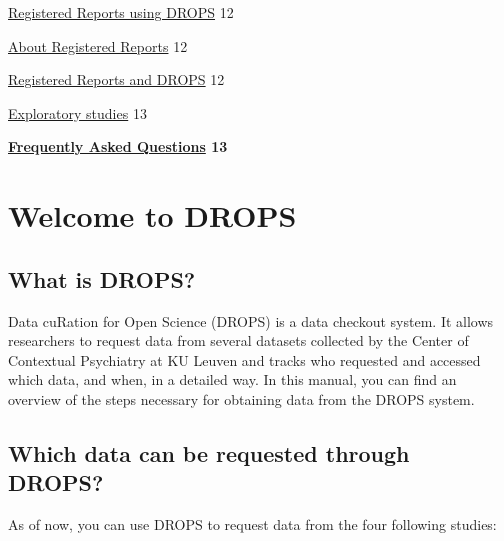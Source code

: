\documentclass[
]{article}
\begin{document}
\protect\hyperlink{_ffqkpx648yj2}{Registered Reports using DROPS} 12

\protect\hyperlink{_frgb5bv2wcbm}{About Registered Reports} 12

\protect\hyperlink{_6or3tby42f75}{Registered Reports and DROPS} 12

\protect\hyperlink{_q6nxcc4a4n2f}{Exploratory studies} 13

\textbf{\protect\hyperlink{_zc50z372ij74}{Frequently Asked Questions}
13}

\hypertarget{welcome-to-drops}{%
\section{Welcome to DROPS}\label{welcome-to-drops}}

\hypertarget{what-is-drops}{%
\subsection{What is DROPS?}\label{what-is-drops}}

Data cuRation for Open Science (DROPS) is a data checkout system. It
allows researchers to request data from several datasets collected by
the Center of Contextual Psychiatry at KU Leuven and tracks who
requested and accessed which data, and when, in a detailed way. In this
manual, you can find an overview of the steps necessary for obtaining
data from the DROPS system.

\hypertarget{which-data-can-be-requested-through-drops}{%
\subsection{Which data can be requested through
DROPS?}\label{which-data-can-be-requested-through-drops}}

As of now, you can use DROPS to request data from the four following
studies:
\end{document}
